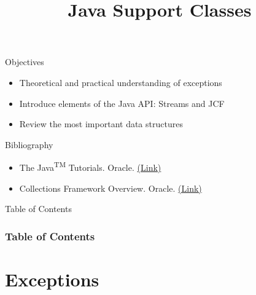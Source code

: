 \documentclass[10pt,compress]{beamer} %
\title[Java Support Classes]{Java Support Classes}
\author{}
\institute{\asignatura}
\date{}
\begin{document}
{\titlepageBlue
    \begin{frame}
        \titlepage
    \end{frame}
}

\begin{frame}[plain]{}
   \begin{block}{Objectives}
      \begin{itemize}
	\item Theoretical and practical understanding of exceptions
	\item Introduce elements of the Java API: Streams and JCF
        \item Review the most important data structures
      \end{itemize} 
   \end{block}

   \begin{block}{Bibliography}
      \begin{itemize}
          \item The Java\textsuperscript{TM} Tutorials. Oracle. \href{https://docs.oracle.com/javase/tutorial/}{(Link)}
          \item Collections Framework Overview. Oracle. \href{http://docs.oracle.com/javase/7/docs/technotes/guides/collections/overview.html}{(Link)}
      \end{itemize} 
   \end{block}
\end{frame}

{
\begin{frame}[shrink]{Table of Contents}
 \frametitle{Table of Contents}
 \tableofcontents
\end{frame}
}

\section{Exceptions}
\end{document}
